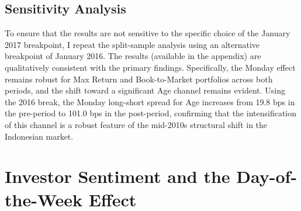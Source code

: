 \documentclass[
	a4paper,
	10pt,
	twoside,
]{LTJournalArticle}
\begin{document}
\begin{table}[htbp]
	\caption{Day-of-Week FF3 Alphas: Pre-Period (Break 2017-01, bps/month)}
	\label{tab:split_ff3_pre}
	
\end{table}

\begin{table}[htbp]
	\caption{Day-of-Week FF3 Alphas: Post-Period (Break 2017-01, bps/month)}
	\label{tab:split_ff3_post}
	
\end{table}

\begin{table}[htbp]
	\caption{FF3 Structural Break Tests: HAC Wald $F$-Statistics (Break 2017-01)}
	\label{tab:wald_ff3}
	
\end{table}

\subsection{Sensitivity Analysis}

To ensure that the results are not sensitive to the specific choice of the January 2017 breakpoint, I repeat the split-sample analysis using an alternative breakpoint of January 2016. The results (available in the appendix) are qualitatively consistent with the primary findings. Specifically, the Monday effect remains robust for Max Return and Book-to-Market portfolios across both periods, and the shift toward a significant Age channel remains evident. Using the 2016 break, the Monday long-short spread for Age increases from 19.8 bps in the pre-period to 101.0 bps in the post-period, confirming that the intensification of this channel is a robust feature of the mid-2010s structural shift in the Indonesian market.


\section{Investor Sentiment and the Day-of-the-Week Effect}

%
\end{document}
